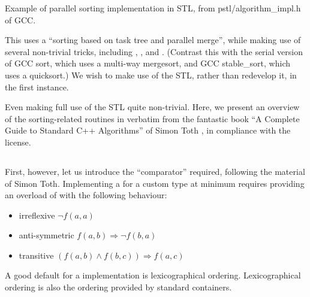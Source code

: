 \begin{codebox}[breakable]{\href{https://github.com/gcc-mirror/gcc/blob/16e2427f50c208dfe07d07f18009969502c25dc8/libstdc%2B%2B-v3/include/pstl/algorithm_impl.h#L2107}{\ExternalLink}}
\footnotesize Example of parallel sorting implementation in STL, from pstl/algorithm\_impl.h of GCC.
\tcblower
{}
\end{codebox}

This uses a ``sorting based on task tree and parallel merge'', while making use of several non-trivial tricks, including , , and . (Contrast this with the serial version of GCC sort, which uses a multi-way mergesort, and GCC stable\_sort, which uses a quicksort.) We wish to make use of the STL, rather than redevelop it, in the first instance. 


Even making full use of the STL quite non-trivial. Here, we present an overview of the sorting-related routines in verbatim from the fantastic book ``A Complete Guide to Standard C++ Algorithms'' of Simon Toth \cite{toth2023}, in compliance with the license. 

\subsection{}

First, however, let us introduce the  ``comparator'' required, following the material of Simon Toth.
Implementing a  for a custom type at minimum requires providing an overload of  with the following behaviour:

\begin{itemize}
    \item irreflexive $\neg f(a,a)$
    \item anti-symmetric $f(a,b) \Rightarrow \neg f(b,a)$
    \item transitive $(f(a,b) \wedge f(b,c)) \Rightarrow f(a,c)$
\end{itemize}

A good default for a  implementation is lexicographical ordering. Lexicographical ordering is also the ordering provided by standard containers.


